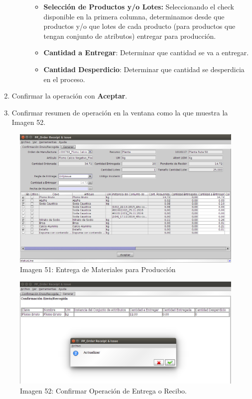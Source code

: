 \documentclass[letterpaper,10pt,spanish]{sphinxmanual}
\begin{document}
\begin{enumerate}
\begin{description}
\begin{itemize}
\item {} 
\textbf{Selección de Productos y/o Lotes:} Seleccionando el check disponible en la primera columna, determinamos desde que productos y/o que lotes de cada producto (para productos que tengan conjunto de atributos) entregar para producción.

\item {} 
\textbf{Cantidad a Entregar}: Determinar que cantidad se va a entregar.

\item {} 
\textbf{Cantidad Desperdicio}: Determinar que cantidad se desperdicia en el proceso.

\end{itemize}

\end{description}

\item {} 
Confirmar la operación con \textbf{Aceptar}.

\item {} 
Confirmar resumen de operación en la ventana como la que muestra la Imagen 52.

\end{enumerate}
\begin{figure}[htbp]
\centering
\capstart

\includegraphics{ly_entrega.png}
\caption{Imagen 51: Entrega de Materiales para Producción}\end{figure}
\begin{figure}[htbp]
\centering
\capstart

\includegraphics{ly_entrega_confirmar.png}
\caption{Imagen 52: Confirmar Operación de Entrega o Recibo.}\end{figure}
\end{document}
